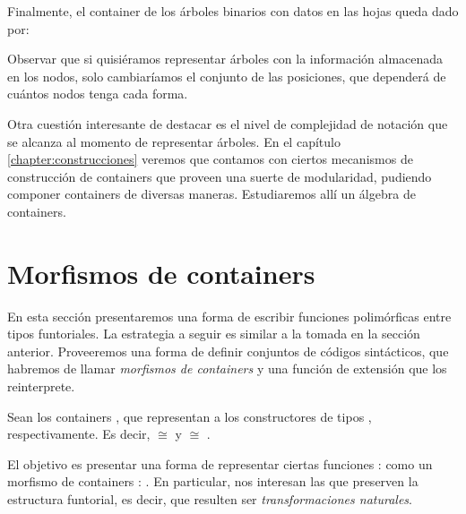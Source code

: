 \begin{example}
Finalmente, el container de los árboles binarios con datos en las hojas queda dado por:



Observar que si quisiéramos representar árboles con la información almacenada en
los nodos, solo cambiaríamos el conjunto de las posiciones, que dependerá de cuántos nodos tenga cada forma.

Otra cuestión interesante de destacar es el nivel de complejidad de notación que se alcanza al momento de representar árboles. En el capítulo \ref{chapter:construcciones} veremos que contamos con ciertos mecanismos de construcción de containers que proveen una suerte de modularidad, pudiendo componer containers de diversas maneras.
Estudiaremos allí un álgebra de containers.
\end{example}


\section{Morfismos de containers}

En esta sección presentaremos una forma de escribir funciones polimórficas entre tipos funtoriales. La estrategia a seguir es similar a la tomada en la sección anterior. Proveeremos una forma de definir conjuntos de códigos sintácticos, que habremos de llamar {\it morfismos de containers} y una función de extensión que los reinterprete.

Sean los containers
,  \AgdaSymbol{:} 
que representan a los constructores de tipos ,   \AgdaSymbol{:}  \AgdaSymbol{$\to$}  respectivamente.
Es decir,  $\cong$  y  $\cong$ .

El objetivo es presentar una forma de representar ciertas funciones
 : \AgdaSymbol{$\forall$}   \AgdaSymbol{$\to$}  
como un morfismo de containers
 :  \AgdaFunction{$\Rightarrow$} .
En particular, nos interesan las  que 
preserven la estructura funtorial, es decir, que resulten ser {\it transformaciones naturales}.

